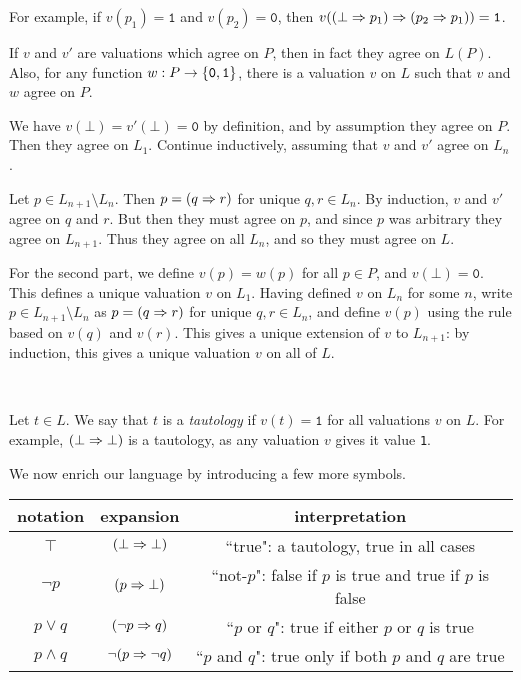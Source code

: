 \documentclass{article}
\begin{document}
For example, if $v(p_1) = \texttt{1}$ and $v(p_2) = \texttt{0}$, then $v((\bot \Rightarrow p_1) \Rightarrow (p_2 \Rightarrow p_1)) = \texttt{1}$.

\begin{proposition}
    If $v$ and $v'$ are valuations which agree on $P$, then in fact they agree on $L(P)$. Also, for any function $w: P \to \left\lbrace \texttt{0}, \texttt{1} \right\rbrace$, there is a valuation $v$ on $L$ such that $v$ and $w$ agree on $P$.
\end{proposition}

\begin{prf}
    We have $v(\bot) = v'(\bot) = \texttt{0}$ by definition, and by assumption they agree on $P$. Then they agree on $L_1$. Continue inductively, assuming that $v$ and $v'$ agree on $L_n$.
    
    Let $p\in L_{n+1} \setminus L_n$. Then $p = (q \Rightarrow r)$ for unique $q, r \in L_n$. By induction, $v$ and $v'$ agree on $q$ and $r$. But then they must agree on $p$, and since $p$ was arbitrary they agree on $L_{n+1}$. Thus they agree on all $L_n$, and so they must agree on $L$.
    
    For the second part, we define $v(p) = w(p)$ for all $p \in P$, and $v(\bot) = \texttt{0}$. This defines a unique valuation $v$ on $L_1$. Having defined $v$ on $L_n$ for some $n$, write $p\in L_{n+1} \setminus L_n$ as $p = (q \Rightarrow r)$ for unique $q, r \in L_n$, and define $v(p)$ using the rule based on $v(q)$ and $v(r)$. This gives a unique extension of $v$ to $L_{n+1}$: by induction, this gives a unique valuation $v$ on all of $L$.
\end{prf}

\

\begin{definition}[Tautology]
    Let $t \in L$. We say that $t$ is a \textit{tautology} if $v(t) = \texttt{1}$ for all valuations $v$ on $L$. For example, $(\bot \Rightarrow \bot)$ is a tautology, as any valuation $v$ gives it value \texttt{1}.
\end{definition}

We now enrich our language by introducing a few more symbols.

\renewcommand{\arraystretch}{1.3}

\begin{table}[h!]
\small{
\begin{center}

\begin{tabular}{|c|c|c|}
\hline
{\textbf{notation}} & {\textbf{expansion}} & {\textbf{interpretation}} \\ \hline
$\top$ & $(\bot \Rightarrow \bot)$ & ``true": a tautology, true in all cases \\ \hline
$\lnot p$ & $(p \Rightarrow \bot)$ & ``not-$p$": false if $p$ is true and true if $p$ is false \\ \hline
$p \lor q$ & $(\lnot p \Rightarrow q)$ & ``$p$ or $q$": true if either $p$ or $q$ is true \\ \hline
$p \land q$ & $\lnot(p \Rightarrow \lnot q)$ & ``$p$ and $q$": true only if both $p$ and $q$ are true \\ \hline
\end{tabular}
\end{center}
}
\end{table}
\end{document}
